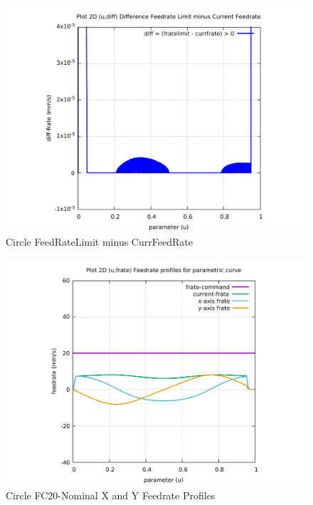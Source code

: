 \begin{figure}
	\caption     {Circle FeedRateLimit minus CurrFeedRate}
	\label{12-img-Circle-FeedRateLimit-minus-CurrFeedRate.pdf}
	\includegraphics[width=1.00\textwidth]{Chap4/appendix/app-Circle/plots/12-img-Circle-FeedRateLimit-minus-CurrFeedRate.pdf}
\end{figure}

\clearpage
\pagebreak

\begin{figure}
	\caption     {Circle FC20-Nominal X and Y Feedrate Profiles}
	\label{13-img-Circle-FC20-Nominal-X-and-Y-Feedrate-Profiles.pdf}
	\includegraphics[width=1.00\textwidth]{Chap4/appendix/app-Circle/plots/13-img-Circle-FC20-Nominal-X-and-Y-Feedrate-Profiles.pdf}
\end{figure}


